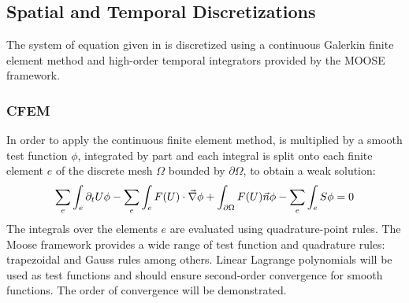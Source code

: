 \subsection{Spatial and Temporal Discretizations} \label{sec:disc}
The system of equation given in  is discretized using a continuous Galerkin finite element method and high-order temporal integrators provided by the MOOSE framework.
\subsubsection{CFEM} 
In order to apply the continuous finite element method,  is multiplied by a smooth test function $\phi$, integrated by part and each integral is split onto each finite element $e$ of the discrete mesh $\Omega$ bounded by $\partial \Omega$, to obtain a weak solution:
\begin{equation}
\sum_e \int_{e} \partial_t U \phi - \sum_e \int_{e} F(U) \cdot \vec{\nabla} \phi + \int_{\partial \Omega} F(U) \vec{n} \phi - \sum_e \int_{e} S \phi = 0
\end{equation}
The integrals over the elements $e$ are evaluated using quadrature-point rules. The Moose framework provides a wide range of test function and quadrature rules: trapezoidal and Gauss rules among others. Linear Lagrange polynomials will be used as test functions and should ensure second-order convergence for smooth functions. The order of convergence will be demonstrated.
